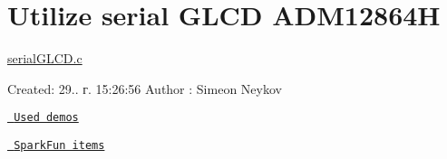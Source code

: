 \section*{Utilize serial G\+L\+CD A\+D\+M12864H}

\mbox{\hyperlink{serial_g_l_c_d_8c}{serial\+G\+L\+C\+D.\+c}}

Created\+: 29.. г. 15\+:26\+:56 Author \+: Simeon Neykov

\href{https://www.avrfreaks.net/forum/tut-c-bit-manipulation-aka-programming-101?name=PNphpBB2&file=viewtopic&t=37871}{\texttt{ Used demos}}

\href{https://learn.sparkfun.com/tutorials/serial-graphic-lcd-hookup/?_ga=1.12355956.1126191215.1366741676}{\texttt{ Spark\+Fun items}} 